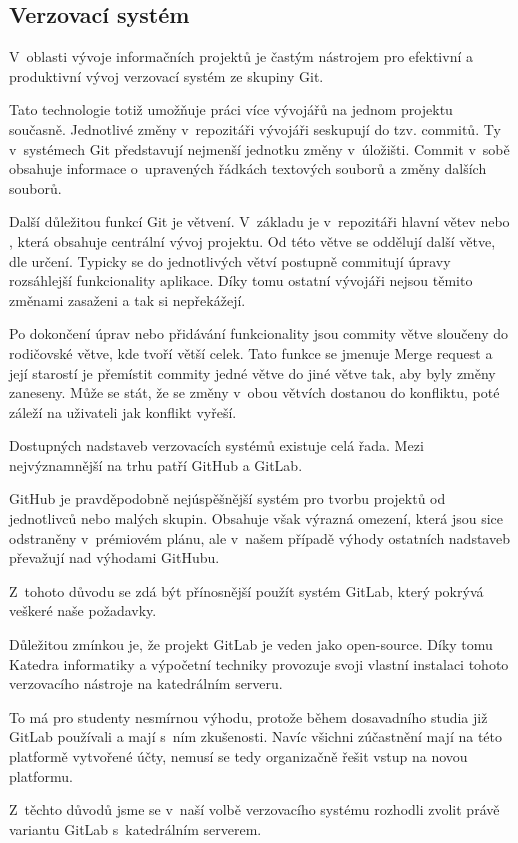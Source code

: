 \documentclass[czech,BP]{thesiskiv}
\begin{document}
\subsection{Verzovací systém}
	\par V~oblasti vývoje informačních projektů je častým nástrojem pro efektivní a produktivní vývoj verzovací systém ze skupiny Git.
	\par Tato technologie totiž umožňuje práci více vývojářů na jednom projektu současně. Jednotlivé změny v~repozitáři vývojáři seskupují do tzv. commitů. Ty v~systémech Git představují nejmenší jednotku změny v~úložišti. Commit v~sobě obsahuje informace o~upravených řádkách textových souborů a změny dalších souborů.
	\par Další důležitou funkcí Git je větvení. V~základu je v~repozitáři hlavní větev  nebo , která obsahuje centrální vývoj projektu. Od této větve se oddělují další větve, dle určení. Typicky se do jednotlivých větví postupně commitují úpravy rozsáhlejší funkcionality aplikace. Díky tomu ostatní vývojáři nejsou těmito změnami zasaženi a tak si nepřekážejí.
	\par Po dokončení úprav nebo přidávání funkcionality jsou commity větve sloučeny do rodičovské větve, kde tvoří větší celek. Tato funkce se jmenuje Merge request a její starostí je přemístit commity jedné větve do jiné větve tak, aby byly změny zaneseny. Může se stát, že se změny v~obou větvích dostanou do konfliktu, poté záleží na uživateli jak konflikt vyřeší.
	\par Dostupných nadstaveb verzovacích systémů existuje celá řada. Mezi nejvýznamnější na trhu patří GitHub a GitLab.
	\par GitHub je pravděpodobně nejúspěšnější systém pro tvorbu projektů od jednotlivců nebo malých skupin. Obsahuje však výrazná omezení, která jsou sice odstraněny v~prémiovém plánu, ale v~našem případě výhody ostatních nadstaveb převažují nad výhodami GitHubu.
	\par Z~tohoto důvodu se zdá být přínosnější použít systém GitLab, který pokrývá veškeré naše požadavky. 
	\par Důležitou zmínkou je, že projekt GitLab je veden jako open-source. Díky tomu Katedra informatiky a výpočetní techniky provozuje svoji vlastní instalaci tohoto verzovacího nástroje na katedrálním serveru.
	\par To má pro studenty nesmírnou výhodu, protože během dosavadního studia již GitLab používali a mají s~ním zkušenosti. Navíc všichni zúčastnění mají na této platformě vytvořené účty, nemusí se tedy organizačně řešit vstup na novou platformu.
	\par Z~těchto důvodů jsme se v~naší volbě verzovacího systému rozhodli zvolit právě variantu GitLab s~katedrálním serverem.
\end{document}
